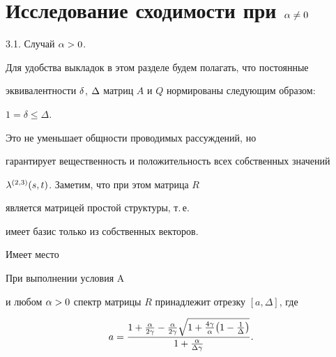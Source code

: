 \section{Исследование сходимости при $ \alpha \neq 0 $}





3.1. Случай $\alpha > 0$.


Для удобства выкладок в этом разделе будем полагать, что постоянные


эквивалентности $\delta$, $\Delta$ матриц $A$ и $Q$ нормированы следующим образом:


$1 = \delta \leq \Delta$.


Это не уменьшает общности проводимых рассуждений, но


гарантирует вещественность и положительность всех собственных значений


$\lambda^{(2,3)}(s,t)$. Заметим, что при этом матрица $R$


является матрицей простой структуры, т.\,е.


имеет базис только из собственных векторов.





Имеет место





\begin{thm}


При выполнении условия $\mathrm A$


и любом $\alpha > 0$ спектр матрицы $R$ принадлежит отрезку $[a,\Delta]$, где


\begin{equation}


\label{equa8}


a=\dfrac{1+\frac{\za}{2\zg} - \frac{\za}{2\zg}


\sqrt{1+\frac{4\zg}{\za}\big(1-\frac1{\zD}\big)}}


{1+\frac{\za}{\zD\zg}}.


\end{equation}


\end{thm}





